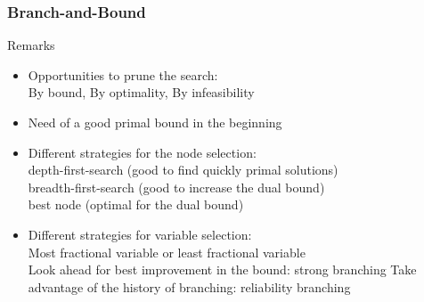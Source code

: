 \documentclass[9pt]{beamer}
\begin{document}
\begin{frame}
\frametitle{Branch-and-Bound}
\begin{block}{Remarks}
\begin{itemize}
\item<1-> Opportunities to prune the search:\\
\alert{By bound, By optimality, By infeasibility}
\item<1-> Need of a good \alert{primal bound} in the beginning
\item<1-> Different strategies for the \alert{node selection}:\\
depth-first-search (good to find quickly primal solutions)\\
breadth-first-search (good to increase the \alert{dual bound})\\
best node (optimal for the \alert{dual bound})
\item<1-> Different strategies for \alert{variable selection}:\\
Most fractional variable or least fractional variable\\
Look ahead for best improvement in the bound: \alert{strong branching}
Take advantage of the history of branching: \alert{reliability branching}\\
\end{itemize}
\end{block}
\end{frame}
\end{document}
